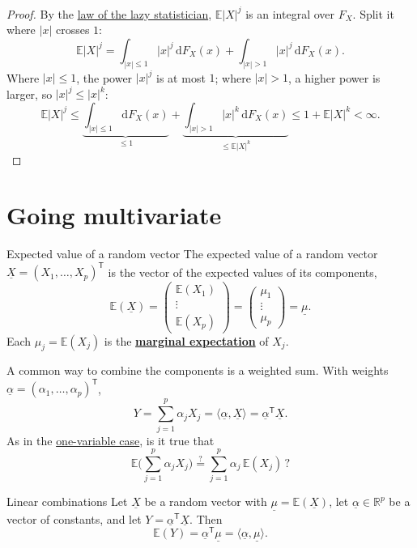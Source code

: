 \documentclass[a4paper,12pt,oneside]{report}
\begin{document}
\begin{proof}
By the \hyperref[sec:lazy]{law of the lazy statistician}, $\mathbb{E}|X|^j$
is an integral over $F_X$. Split it where $|x|$ crosses $1$:
\[
\mathbb{E}|X|^j=\int_{|x|\le1}|x|^j\,\mathrm{d}F_X(x)+\int_{|x|>1}|x|^j\,\mathrm{d}F_X(x).
\]
Where $|x|\le1$, the power $|x|^j$ is at most $1$; where $|x|>1$, a higher
power is larger, so $|x|^j\le|x|^k$:
\[
\mathbb{E}|X|^j\le\underbrace{\int_{|x|\le1}\mathrm{d}F_X(x)}_{\le1}
+\underbrace{\int_{|x|>1}|x|^k\,\mathrm{d}F_X(x)}_{\le\mathbb{E}|X|^k}
\le1+\mathbb{E}|X|^k<\infty .
\]
\end{proof}

\section{Going multivariate}\label{sec:multivariate}

\begin{frameddefn}{Expected value of a random vector}\label{def:expected-vector}
The expected value of a random vector $\underline{X}=(X_1,\ldots,X_p)^{\mathsf T}$ is
the vector of the expected values of its components,
\[
\mathbb{E}(\underline{X})=\begin{pmatrix}\mathbb{E}(X_1)\\ \vdots\\ \mathbb{E}(X_p)\end{pmatrix}
=\begin{pmatrix}\mu_1\\ \vdots\\ \mu_p\end{pmatrix}=\underline{\mu}.
\]
Each $\mu_j=\mathbb{E}(X_j)$ is the \hyperref[marginal]{\textbf{marginal expectation}} of
$X_j$.
\end{frameddefn}

A common way to combine the components is a weighted sum. With weights
$\underline{\alpha}=(\alpha_1,\ldots,\alpha_p)^{\mathsf T}$,
\[
Y=\sum_{j=1}^p\alpha_jX_j=\langle\underline{\alpha},\underline{X}\rangle
=\underline{\alpha}^{\mathsf T}\underline{X}.
\]
As in the \hyperref[prop:linear]{one-variable case}, is it true that
\[
\mathbb{E}\Big(\sum_{j=1}^p\alpha_jX_j\Big)\overset{?}{=}\sum_{j=1}^p\alpha_j\,\mathbb{E}(X_j)\,?
\]

\begin{framedprop}{Linear combinations}\label{prop:linear-vector}
Let $\underline{X}$ be a random vector with $\underline{\mu}=\mathbb{E}(\underline{X})$,
let $\underline{\alpha}\in\mathbb{R}^p$ be a vector of constants, and let
$Y=\underline{\alpha}^{\mathsf T}\underline{X}$. Then
\[
\mathbb{E}(Y)=\underline{\alpha}^{\mathsf T}\underline{\mu}
=\langle\underline{\alpha},\underline{\mu}\rangle .
\]
\end{framedprop}
\end{document}
